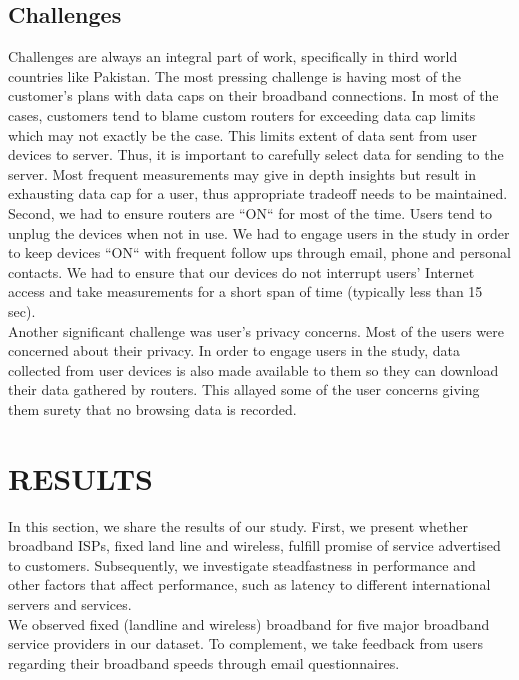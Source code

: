 \documentclass{sig-alternate-10pt}
\begin{document}
\subsection{Challenges}
Challenges are always an integral part of work, specifically in third world countries like Pakistan. The most pressing challenge is having most of the customer's plans with data caps on their broadband connections. In most of the cases, customers tend to blame custom routers for exceeding data cap limits which may not exactly be the case. This limits extent of data sent from user devices to server. Thus, it is important to carefully select data for sending to the server. Most frequent measurements may give in depth insights but result in exhausting data cap for a user, thus appropriate tradeoff needs to be maintained.\\
\indent	 Second, we had to ensure routers are ``ON`` for most of the time. Users tend to unplug the devices when not in use. We had to engage users in the study in order to keep devices ``ON`` with frequent follow ups through email, phone and personal contacts. We had to ensure that our devices do not interrupt users' Internet access and take measurements for a short span of time (typically less than 15 sec).\\
\indent Another significant challenge was user's privacy concerns. Most of the users were concerned about their privacy. In order to engage users in the study, data collected from user devices is also made available to them so they can download their data gathered by routers. This allayed some of the user concerns giving them surety that no browsing data is recorded.

\section {RESULTS}
In this section, we share the results of our study. First, we present whether broadband ISPs, fixed land line and wireless, fulfill promise of service advertised to customers. Subsequently, we investigate steadfastness in performance and other factors that affect performance, such as latency to different international servers and services.\\
\indent We observed fixed (landline and wireless) broadband for five major broadband service providers in our dataset. To complement, we take feedback from users regarding their broadband speeds through email questionnaires.
\end{document}
